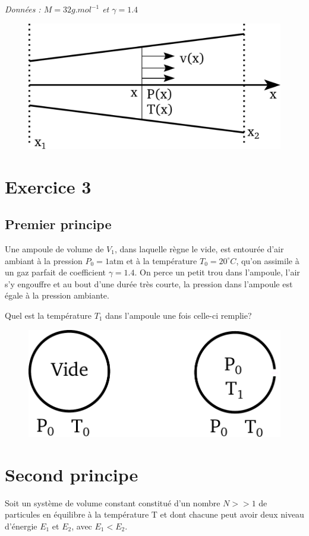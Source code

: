 \documentclass{report}
\begin{document}
\textit{Données : $M = 32g.mol^{-1}$ et $\gamma=1.4$}

\begin{figure}[!h]
\centering
\includegraphics[width=0.4\linewidth]{turbine.pdf}
\end{figure}

\newpage

\section*{Exercice 3}

\subsection*{Premier principe}

Une ampoule de volume de $V_1$, dans laquelle règne le vide, est entourée d'air ambiant à la pression $P_{0} = 1$atm et à la température $T_{0}=20^{\circ}C$, qu'on assimile à un gaz parfait de coefficient $\gamma=1.4$. On perce un petit trou dans l'ampoule, l'air s'y engouffre et au bout d'une durée très courte, la pression dans l'ampoule est égale à la pression ambiante.

Quel est la température $T_{1}$ dans l'ampoule une fois celle-ci remplie?

\begin{figure}[!h]
\centering
\includegraphics[width=0.5\linewidth]{ampoule.pdf}
\end{figure}

\section*{Second principe}

Soit un système de volume constant constitué d'un nombre $N>>1$ de particules en équilibre à la température T et dont chacune peut avoir deux niveau d'énergie $E_{1}$ et $E_{2}$, avec $E_{1}<E_{2}$.
\end{document}
